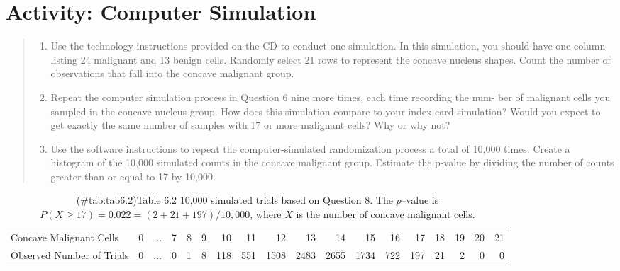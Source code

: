 \documentclass[
]{report}
\providecommand{\tightlist}{%
  \setlength{\itemsep}{0pt}\setlength{\parskip}{0pt}}
\begin{document}
\section*{Activity: Computer Simulation}\label{activity-computer-simulation}

\begin{quote}
\begin{enumerate}
\def\labelenumi{\arabic{enumi}.}
\setcounter{enumi}{5}
\tightlist
\item
  Use the technology instructions provided on the CD to conduct one simulation. In this simulation, you
  should have one column listing 24 malignant and 13 benign cells. Randomly select 21 rows to represent
  the concave nucleus shapes. Count the number of observations that fall into the concave malignant group.
\item
  Repeat the computer simulation process in Question 6 nine more times, each time recording the num-
  ber of malignant cells you sampled in the concave nucleus group. How does this simulation compare to
  your index card simulation? Would you expect to get exactly the same number of samples with 17 or
  more malignant cells? Why or why not?
\item
  Use the software instructions to repeat the computer-simulated randomization process a total of 10,000
  times. Create a histogram of the 10,000 simulated counts in the concave malignant group. Estimate the
  p-value by dividing the number of counts greater than or equal to 17 by 10,000.
\end{enumerate}
\end{quote}

\begin{table}

\caption{(\#tab:tab6.2)Table 6.2 10,000 simulated trials based on Question 8. The $p$–value is $P(X\ge17)=0.022=(2+21+197)/10,000$, where $X$ is the number of concave malignant cells.}
\centering
\begin{tabular}[t]{>{\raggedright\arraybackslash}p{2cm}lrrrrrrrrrrrrrrrr}
\toprule
\midrule
Concave Malignant Cells & 0 & ... & 7 & 8 & 9 & 10 & 11 & 12 & 13 & 14 & 15 & 16 & 17 & 18 & 19 & 20 & 21\\
Observed Number of Trials & 0 & ... & 0 & 1 & 8 & 118 & 551 & 1508 & 2483 & 2655 & 1734 & 722 & 197 & 21 & 2 & 0 & 0\\
\bottomrule
\end{tabular}
\end{table}
\end{document}
